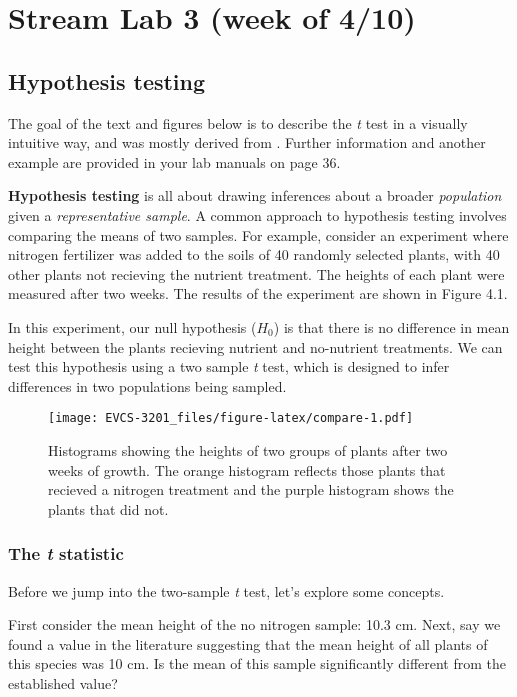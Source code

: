 \documentclass[]{book}
\begin{document}
\chapter{Stream Lab 3 (week of 4/10)}\label{stream-lab-3-week-of-410}

\section{Hypothesis testing}\label{hypothesis-testing}

The goal of the text and figures below is to describe the \emph{t} test
in a visually intuitive way, and was mostly derived from
\citet{zar1984}. Further information and another example are provided in
your lab manuals on page 36.

\textbf{Hypothesis testing} is all about drawing inferences about a
broader \emph{population} given a \emph{representative sample}. A common
approach to hypothesis testing involves comparing the means of two
samples. For example, consider an experiment where nitrogen fertilizer
was added to the soils of 40 randomly selected plants, with 40 other
plants not recieving the nutrient treatment. The heights of each plant
were measured after two weeks. The results of the experiment are shown
in Figure 4.1.

In this experiment, our null hypothesis (\(H_0\)) is that there is no
difference in mean height between the plants recieving nutrient and
no-nutrient treatments. We can test this hypothesis using a two sample
\emph{t} test, which is designed to infer differences in two populations
being sampled.

\begin{figure}
\centering
\texttt{[image: EVCS-3201\_files/figure-latex/compare-1.pdf]}
\caption{\label{fig:compare}Histograms showing the heights of two groups of
plants after two weeks of growth. The orange histogram reflects those
plants that recieved a nitrogen treatment and the purple histogram shows
the plants that did not.}
\end{figure}

\subsection{\texorpdfstring{The \emph{t}
statistic}{The t statistic}}\label{the-t-statistic}

Before we jump into the two-sample \emph{t} test, let's explore some
concepts.

First consider the mean height of the no nitrogen sample: 10.3 cm. Next,
say we found a value in the literature suggesting that the mean height
of all plants of this species was 10 cm. Is the mean of this sample
significantly different from the established value?
\end{document}
